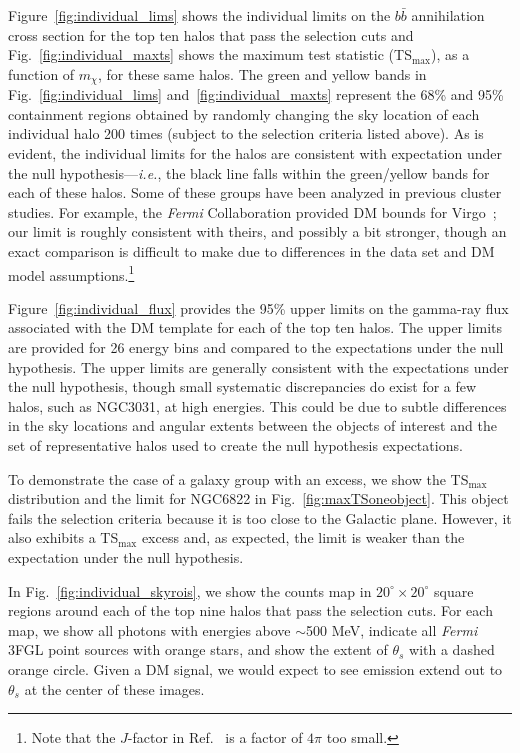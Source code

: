 Figure~\ref{fig:individual_lims} shows the individual limits on the $b\bar{b}$ annihilation cross section for the top ten halos that pass the selection cuts and Fig.~\ref{fig:individual_maxts}  shows the maximum test statistic (TS$_\text{max}$), as a function of $m_\chi$, for these same halos. The green and yellow bands in Fig.~\ref{fig:individual_lims} and~\ref{fig:individual_maxts} represent the 68\% and 95\% containment regions obtained by randomly changing the sky location of each individual halo 200 times (subject to the selection criteria listed above). 
As is evident, the individual limits for the halos  are consistent with expectation under the null hypothesis---\emph{i.e.}, the black line falls within the green/yellow bands for each of these halos.  Some of these groups have been analyzed in previous cluster studies.  For example, the \emph{Fermi} Collaboration provided DM bounds for Virgo~\cite{Ackermann:2015fdi}; our limit is roughly consistent with theirs, and possibly a bit stronger, though an exact comparison is difficult to make due to differences in the data set and DM model assumptions.\footnote{Note that the $J$-factor in Ref.~\cite{Ackermann:2015fdi} is a factor of $4\pi$ too small.}

Figure~\ref{fig:individual_flux} provides the 95\% upper limits on the gamma-ray flux associated with the DM template for each of the top ten halos.  The upper limits are provided for 26 energy bins and compared to the expectations under the null hypothesis.  The upper limits are generally consistent with the expectations under the null hypothesis, though small systematic discrepancies do exist for a few halos, such as NGC3031, at high energies.  This could be due to subtle differences in the sky locations and angular extents between the objects of interest and the set of representative halos used to create the null hypothesis expectations. 

To demonstrate the case of a galaxy group with an excess, we show the TS$_\text{max}$ distribution and the limit for NGC6822 in Fig.~\ref{fig:maxTSoneobject}.  This object fails the selection criteria because it is too close to the Galactic plane. However, it also exhibits a TS$_\text{max}$ excess and, as expected, the limit is weaker than the expectation under the null hypothesis. \vspace{0.1in}

 In Fig.~\ref{fig:individual_skyrois}, we show the counts map in $20^\circ \times 20^\circ$ square regions around each of the top nine halos that pass the selection cuts.  For each map, we show all photons with energies above $\sim$500 MeV, indicate all {\it Fermi} 3FGL point sources with orange stars, and show the extent of $\theta_s$ with a dashed orange circle.  Given a DM signal, we would expect to see emission extend out to $\theta_s$ at the center of these images.

